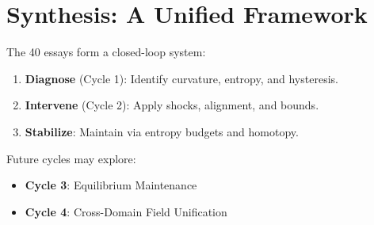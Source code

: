 \documentclass[12pt,a4paper]{article}
\begin{document}
\section{Synthesis: A Unified Framework}
The 40 essays form a closed-loop system:
\begin{enumerate}
\item \textbf{Diagnose} (Cycle 1): Identify curvature, entropy, and hysteresis.
\item \textbf{Intervene} (Cycle 2): Apply shocks, alignment, and bounds.
\item \textbf{Stabilize}: Maintain via entropy budgets and homotopy.
\end{enumerate}

Future cycles may explore:
\begin{itemize}
\item \textbf{Cycle 3}: Equilibrium Maintenance
\item \textbf{Cycle 4}: Cross-Domain Field Unification
\end{itemize}
\end{document}

